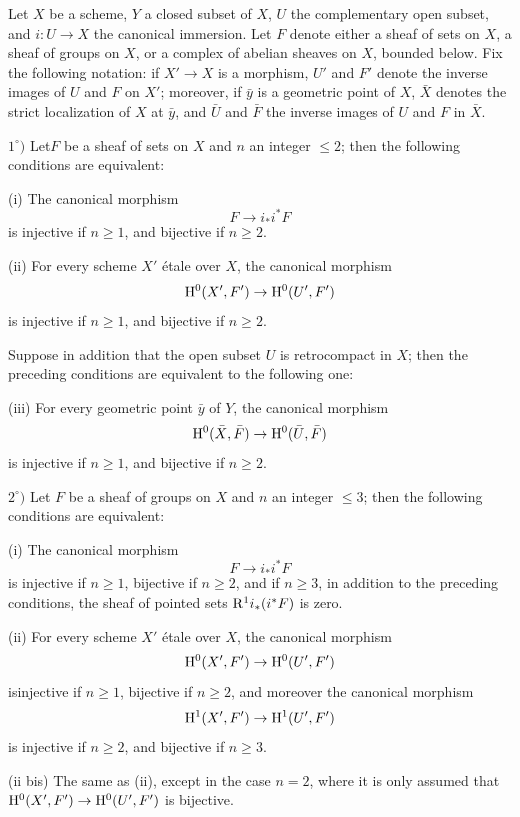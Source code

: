 \enlargethispage{\baselineskip}%
\begin{proposition} \label{XIV.1.1}
Let $X$ be a scheme, $Y$ a closed subset of $X$, $U$ the complementary open subset, and $i:U\to X$ the canonical immersion. Let $F$ denote either a sheaf of sets on $X$, a sheaf of groups on $X$, or a complex of abelian sheaves on $X$, bounded below. Fix the following notation: if $X'\to X$ is a morphism, $U'$ and $F'$ denote the inverse images of $U$ and $F$ on $X'$; moreover, if $\bar{y}$ is a geometric point of $X$, $\bar{X}$ denotes the strict localization of $X$ at $\bar{y}$, and $\bar{U}$ and $\bar{F}$ the inverse images of $U$ and $F$ in $\bar{X}$.

$1^\circ)$ Let\pageoriginale $F$ be a sheaf of sets on $X$ and $n$ an integer $\leq 2$; then the following conditions are equivalent:

\textup{(i)} The canonical morphism
$$F\to i_*i^*F$$
is injective if $n\geq 1$, and bijective if $n\geq 2$.

\textup{(ii)} For every scheme $X'$ \'{e}tale over $X$, the canonical morphism
$$
\mathrm H^0(X', F')\to \mathrm H^0(U', F')
$$
is injective if $n\geq 1$, and bijective if $n\geq 2$.

Suppose in addition that the open subset $U$ is retrocompact in $X$; then the preceding conditions are equivalent to the following one:

\textup{(iii)} For every geometric point $\bar{y}$ of $Y$, the canonical morphism
$$
\mathrm H^0(\bar{X}, \bar{F})\to \mathrm H^0(\bar{U}, \bar{F})$$
is injective if $n\geq 1$, and bijective if $n\geq 2$.

$2^\circ)$ Let $F$ be a sheaf of groups on $X$ and $n$ an integer $\leq 3$; then the following conditions are equivalent:

\textup{(i)} The canonical morphism
$$F\to i_*i^*F$$
is injective if $n\geq 1$, bijective if $n\geq 2$, and if $n\geq 3$, in addition to the preceding conditions, the sheaf of pointed sets $\mathrm R^1i_*(i^*F)$ is zero.

\textup{(ii)} For every scheme $X'$ \'{e}tale over $X$, the canonical morphism
$$
\mathrm H^0(X', F')\to \mathrm H^0(U', F')
$$
is\pageoriginale injective if $n\geq 1$, bijective if $n\geq 2$, and moreover the canonical morphism
$$
\mathrm H^1(X', F')\to \mathrm H^1(U', F')
$$
is injective if $n\geq 2$, and bijective if $n\geq 3$.

\textup{(ii bis)} The same as \textup{(ii)}, except in the case $n=2$, where it is only assumed that $\mathrm H^0(X', F')\to \mathrm H^0(U', F')$ is bijective.


\end{proposition}
